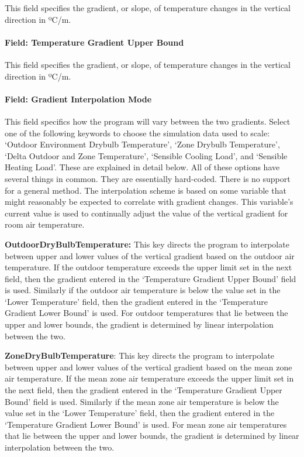 This field specifies the gradient, or slope, of temperature changes in the vertical direction in ºC/m.

\paragraph{Field: Temperature Gradient Upper Bound}\label{field-temperature-gradient-upper-bound}

This field specifies the gradient, or slope, of temperature changes in the vertical direction in ºC/m.

\paragraph{Field: Gradient Interpolation Mode}\label{field-gradient-interpolation-mode}

This field specifics how the program will vary between the two gradients. Select one of the following keywords to choose the simulation data used to scale: `Outdoor Environment Drybulb Temperature', `Zone Drybulb Temperature', `Delta Outdoor and Zone Temperature', `Sensible Cooling Load', and `Sensible Heating Load'. These are explained in detail below. All of these options have several things in common. They are essentially hard-coded. There is no support for a general method. The interpolation scheme is based on some variable that might reasonably be expected to correlate with gradient changes. This variable's current value is used to continually adjust the value of the vertical gradient for room air temperature.

\textbf{OutdoorDryBulbTemperature:} This key directs the program to interpolate between upper and lower values of the vertical gradient based on the outdoor air temperature. If the outdoor temperature exceeds the upper limit set in the next field, then the gradient entered in the `Temperature Gradient Upper Bound' field is used. Similarly if the outdoor air temperature is below the value set in the `Lower Temperature' field, then the gradient entered in the `Temperature Gradient Lower Bound' is used. For outdoor temperatures that lie between the upper and lower bounds, the gradient is determined by linear interpolation between the two.

\textbf{ZoneDryBulbTemperature}: This key directs the program to interpolate between upper and lower values of the vertical gradient based on the mean zone air temperature. If the mean zone air temperature exceeds the upper limit set in the next field, then the gradient entered in the `Temperature Gradient Upper Bound' field is used. Similarly if the mean zone air temperature is below the value set in the `Lower Temperature' field, then the gradient entered in the `Temperature Gradient Lower Bound' is used. For mean zone air temperatures that lie between the upper and lower bounds, the gradient is determined by linear interpolation between the two.

